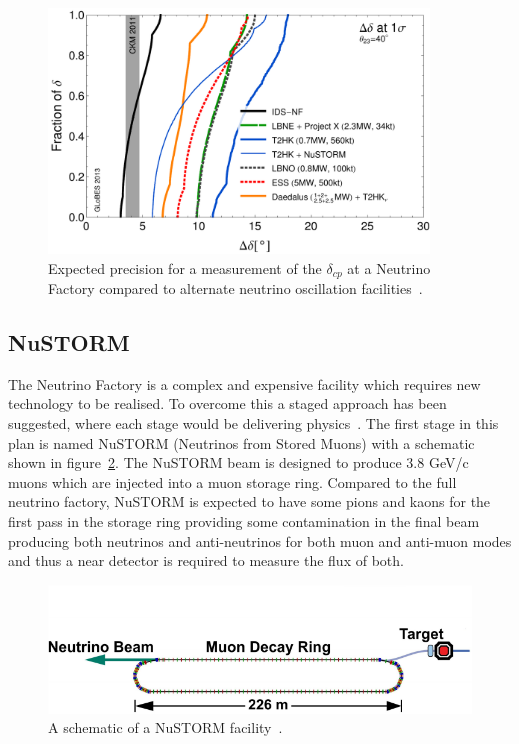 \begin{figure}[h!]
\centering
\includegraphics[width=0.9\textwidth]{figures/rdr-cp-precision-comparison-131216.pdf}
\caption{Expected precision for a measurement of the $\delta_{cp}$ at a Neutrino Factory compared to alternate neutrino oscillation facilities~\cite{Fix7}.}
\label{fig:nuFactExp}
\end{figure}



\subsection{NuSTORM}\label{subsec:NuSTORM}

The Neutrino Factory is a complex and expensive facility which requires new technology to be realised. To overcome this a staged approach has been suggested, where each stage would be delivering physics~\cite{Fix7}. The first stage in this plan is named NuSTORM (Neutrinos from Stored Muons) with a schematic shown in figure~\ref{fig:nuStorm}. The NuSTORM beam is designed to produce 3.8 GeV/c muons which are injected into a muon storage ring. Compared to the full neutrino factory, NuSTORM is expected to have some pions and kaons for the first pass in the storage ring providing some contamination in the final beam producing both neutrinos and anti-neutrinos for both muon and anti-muon modes and thus a near detector is required to measure the flux of both. 

\begin{figure}[h!]
\centering
\includegraphics[width=\textwidth]{figures/nuSTORM_schematic.pdf}
\caption{A schematic of a NuSTORM facility~\cite{Fix7}.}
\label{fig:nuStorm}
\end{figure}

